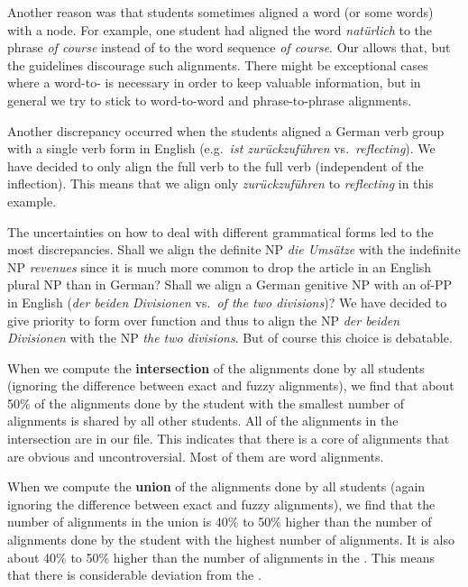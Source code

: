 \documentclass[output=paper]{LSP/langsci}
\begin{document}
Another reason was that students sometimes aligned a word (or some words) with a node. For example, one student had aligned the word \textit{natürlich }to the phrase \textit{of course }instead of to the word sequence \textit{of course}. Our  allows that, but the  guidelines discourage such alignments. There might be exceptional cases where a word-to- is necessary in order to keep valuable information, but in general we try to stick to word-to-word and phrase-to-phrase alignments. 

Another discrepancy occurred when the students aligned a German verb group with a single verb form in English (e.g.~\textit{ist zurückzuführen }vs.~\textit{reflecting}). We have decided to only align the full verb to the full verb (independent of the inflection). This means that we align only \textit{zurückzuführen} to \textit{reflecting }in this example. 

The uncertainties on how to deal with different grammatical forms led to the most discrepancies. Shall we align the definite NP \textit{die Umsätze }with the indefinite NP \textit{revenues }since it is much more common to drop the article in an English plural NP than in German? Shall we align a German genitive NP with an of-PP in English (\textit{der beiden }\textit{Divisionen }vs.~\textit{of the two divisions})? We have decided to give priority to form over function and thus to align the NP \textit{der beiden Divisionen }with the NP \textit{the two divisions}. But of course this choice is debatable. 

When we compute the \textbf{intersection }of the alignments done by all students (ignoring the difference between exact and fuzzy alignments), we find that about 50\% of the alignments done by the student with the smallest number of alignments is shared by all other students. All of the alignments in the intersection are in our  file. This indicates that there is a core of alignments that are obvious and uncontroversial. Most of them are word alignments. 

When we compute the \textbf{union }of the alignments done by all students (again ignoring the difference between exact and fuzzy alignments), we find that the number of alignments in the union is 40\% to 50\% higher than the number of alignments done by the student with the highest number of alignments. It is also about 40\% to 50\% higher than the number of alignments in the . This means that there is considerable deviation from the . 
\end{document}
